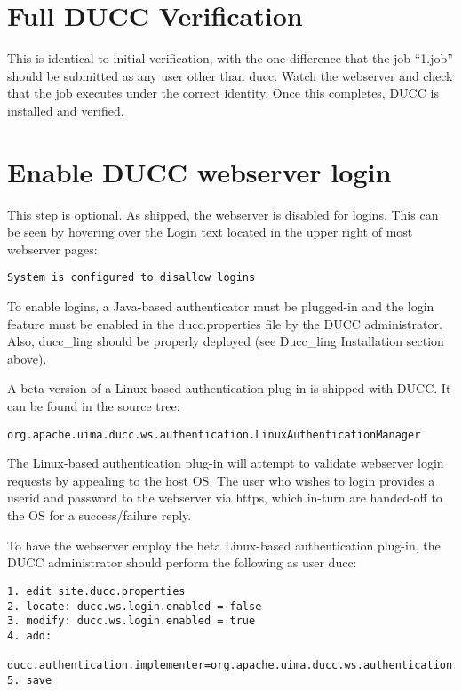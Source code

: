 \section{Full DUCC Verification}

This is identical to initial verification, with the one difference that the job ``1.job'' should be
submitted as any user other than ducc.  Watch the webserver and check that the job executes
under the correct identity.  Once this completes, DUCC is installed and verified.
 
\section{Enable DUCC webserver login}

    This step is optional.  As shipped, the webserver is disabled for
    logins.  This can be seen by hovering over the Login text located in the
    upper right of most webserver pages: 
\begin{verbatim}
System is configured to disallow logins
\end{verbatim}

    To enable logins, a Java-based authenticator must be plugged-in and the
    login feature must be enabled in the ducc.properties file by the DUCC
    administrator.  Also, ducc\_ling should be properly deployed (see 
    Ducc\_ling Installation section above).
    
    A beta version of a Linux-based authentication plug-in is shipped with DUCC.
    It can be found in the source tree:
\begin{verbatim}
org.apache.uima.ducc.ws.authentication.LinuxAuthenticationManager
\end{verbatim}

    The Linux-based authentication plug-in will attempt to validate webserver
    login requests by appealing to the host OS.  The user who wishes to
    login provides a userid and password to the webserver via https, which
    in-turn are handed-off to the OS for a success/failure reply.
    
    To have the webserver employ the beta Linux-based authentication plug-in,
    the DUCC administrator should perform the following as user ducc:
\begin{verbatim}    
1. edit site.ducc.properties
2. locate: ducc.ws.login.enabled = false
3. modify: ducc.ws.login.enabled = true
4. add:
   ducc.authentication.implementer=org.apache.uima.ducc.ws.authentication.LinuxAuthenticationManager
5. save
\end{verbatim}

